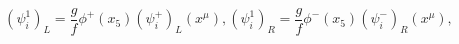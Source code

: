 \begin{equation}
(\psi^1_i)_L=\frac{g}{f}\phi^+(x_5) (\psi_i^+)_L(x^\mu), (\psi^1_i)_R=\frac{g}{f}\phi^-(x_5) (\psi_i^-)_R(x^\mu),
\end{equation}

